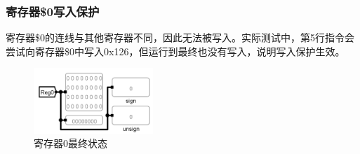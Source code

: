 \documentclass[main.tex]{subfiles}
\begin{document}
\subsubsection{寄存器\$0写入保护}
寄存器\$0的连线与其他寄存器不同，因此无法被写入。实际测试中，第5行指令会尝试向寄存器\$0中写入0x126，但运行到最终也没有写入，说明写入保护生效。
\begin{figure}[H]
\centering
\includegraphics[width=0.4\textwidth]{images/reg0-final.png}
\caption{寄存器0最终状态}
\end{figure}
\end{document}
